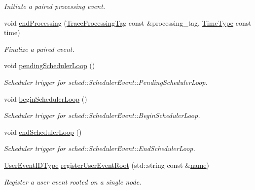 \begin{DoxyCompactItemize}
\begin{DoxyCompactList}\small\item\em Initiate a paired processing event. \end{DoxyCompactList}\item 
void \hyperlink{structvt_1_1trace_1_1_trace_a38cc974390c5524ab1c4d65135086fa6}{end\+Processing} (\hyperlink{structvt_1_1trace_1_1_trace_processing_tag}{Trace\+Processing\+Tag} const \&processing\+\_\+tag, \hyperlink{namespacevt_a2b9f28078dc309ad0706b69ded743e69}{Time\+Type} const time)
\begin{DoxyCompactList}\small\item\em Finalize a paired event. \end{DoxyCompactList}\item 
void \hyperlink{structvt_1_1trace_1_1_trace_a5552347220b63160248f1ff5f14845f3}{pending\+Scheduler\+Loop} ()
\begin{DoxyCompactList}\small\item\em Scheduler trigger for {\ttfamily sched\+::\+Scheduler\+Event\+::\+Pending\+Scheduler\+Loop}. \end{DoxyCompactList}\item 
void \hyperlink{structvt_1_1trace_1_1_trace_a0e6566503861138843e7dc0a9ba30180}{begin\+Scheduler\+Loop} ()
\begin{DoxyCompactList}\small\item\em Scheduler trigger for {\ttfamily sched\+::\+Scheduler\+Event\+::\+Begin\+Scheduler\+Loop}. \end{DoxyCompactList}\item 
void \hyperlink{structvt_1_1trace_1_1_trace_ad7ee4fc8c75874a524ce7cc1501209fd}{end\+Scheduler\+Loop} ()
\begin{DoxyCompactList}\small\item\em Scheduler trigger for {\ttfamily sched\+::\+Scheduler\+Event\+::\+End\+Scheduler\+Loop}. \end{DoxyCompactList}\item 
\hyperlink{namespacevt_1_1trace_a5908920d051c144c89f17c69ed262350}{User\+Event\+I\+D\+Type} \hyperlink{structvt_1_1trace_1_1_trace_a99fcca49a5506c3ee5cda67e541e37cc}{register\+User\+Event\+Root} (std\+::string const \&\hyperlink{structvt_1_1trace_1_1_trace_aaae4bbf6d009229a5c8b9db67a127942}{name})
\begin{DoxyCompactList}\small\item\em Register a user event rooted on a single node. \end{DoxyCompactList}\item 

\end{DoxyCompactItemize}
